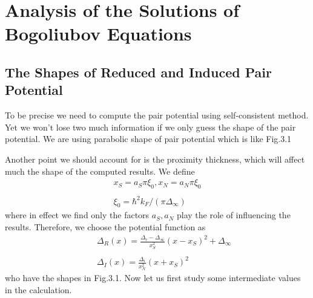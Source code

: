 \section{Analysis of the Solutions of Bogoliubov Equations}
\subsection{The Shapes of Reduced and Induced Pair Potential}
To be precise we need to compute the pair potential using self-consistent method\citep{Reference11}. Yet we won't lose two much information if we only guess the shape of the pair potential\citep{Reference8, Reference4}. We are using parabolic shape of pair potential which is like Fig.3.1

Another point we should account for is the proximity thickness, which will affect much the shape of the computed results. We define
\begin{eqnarray}
x_S=a_S\pi\xi_0,x_N=a_N\pi\xi_0\nonumber\\
\\
\xi_0=\hbar^2 k_F/(\pi\Delta_{\infty})\nonumber
\end{eqnarray}
where in effect we find only the factors $a_S,a_N$ play the role of influencing the results.
Therefore, we choose the potential function as 
\begin{eqnarray}
&&\Delta_R(x)=\frac{\Delta_r-\Delta_{\infty}}{x_S^2}(x-x_S)^2+\Delta_{\infty}\nonumber\\
&&\\
&&\Delta_I(x)=\frac{\Delta_i}{x_N^2}(x+x_S)^2\nonumber
\end{eqnarray}
who have the shapes in Fig.3.1.
Now let us first study some intermediate values in the calculation.
